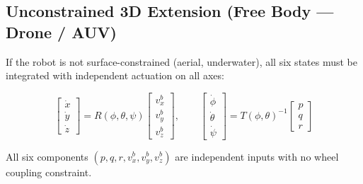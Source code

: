 \documentclass[12pt,a4paper]{article}
\newcommand{\q}{\mathbf{q}}
\begin{document}
\subsection{Unconstrained 3D Extension (Free Body — Drone / AUV)}

If the robot is not surface-constrained (aerial, underwater), all six states
must be integrated with independent actuation on all axes:

\begin{equation}
  \begin{bmatrix}\dot x\\\dot y\\\dot z\end{bmatrix}
  = R(\phi,\theta,\psi)
    \begin{bmatrix}v_x^b\\v_y^b\\v_z^b\end{bmatrix},
  \qquad
  \begin{bmatrix}\dot\phi\\\dot\theta\\\dot\psi\end{bmatrix}
  = T(\phi,\theta)^{-1}
    \begin{bmatrix}p\\q\\r\end{bmatrix}
  \tag{18}
\end{equation}

All six components $(p,q,r,v_x^b,v_y^b,v_z^b)$ are independent inputs with no
wheel coupling constraint.

\end{document}
